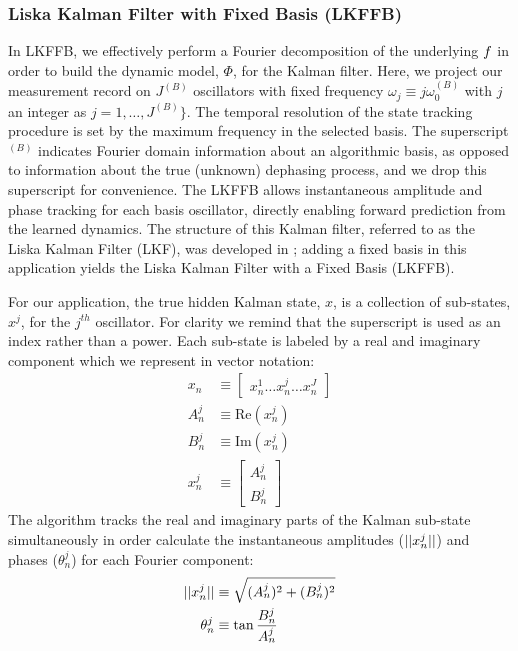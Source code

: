 \documentclass[pra, reprint]{revtex4-1}
\begin{document}
\subsubsection{Liska Kalman Filter with Fixed Basis (LKFFB)}
In LKFFB, we effectively perform a Fourier decomposition of the underlying $f$ in order to build the dynamic model, $\Phi$, for the Kalman filter.   Here, we project our measurement record on $J^{(B)}$ oscillators with fixed frequency $\omega_{j}\equiv j\omega_0^{(B)}$ with $j$ an integer as $j = 1, \hdots, J^{(B)}\}$. The temporal resolution of the state tracking procedure is set by the maximum frequency in the selected basis.  The superscript $ ^{(B)}$ indicates Fourier domain information about an algorithmic basis, as opposed to information about the true (unknown) dephasing process, and we drop this superscript for convenience.  The LKFFB allows instantaneous amplitude and phase tracking for each basis oscillator, directly enabling forward prediction from the learned dynamics.  The structure of this Kalman filter, referred to as the Liska Kalman Filter (LKF), was developed in \cite{livska2007}; adding a fixed basis in this application yields the Liska Kalman Filter with a Fixed Basis (LKFFB).

For our application, the true hidden Kalman state, $x$, is a collection of sub-states, $x^j$, for the $j^{th}$ oscillator. For clarity we remind that the superscript is used as an index rather than a power.  Each sub-state is labeled by a real and imaginary component which we represent in vector notation:
\begin{align}
x_n & \equiv \begin{bmatrix} x^{1}_{n} \hdots x^{j}_{n} \hdots x^{J}_{n} \end{bmatrix} \\
A^j_{n} & \equiv \textrm{Re}(x^{j}_{n}) \\
B^j_{n} & \equiv \textrm{Im}(x^{j}_{n}) \\
x^j_n & \equiv \begin{bmatrix} A^j_{n} \\ B^j_{n}  \end{bmatrix}
\end{align} 
The algorithm tracks the real and imaginary parts of the Kalman sub-state simultaneously in order calculate the instantaneous amplitudes ($||x^j_n||$) and phases ($\theta^{j}_{n}$)  for each Fourier component:
\begin{align}
||x^j_n|| & \equiv \sqrt{(A^j_{n})^2 + (B^j_{n})^2} \\
\theta^{j}_{n} & \equiv \tan{\frac{B^j_{n}}{A^j_{n}}}
\end{align}
\end{document}
